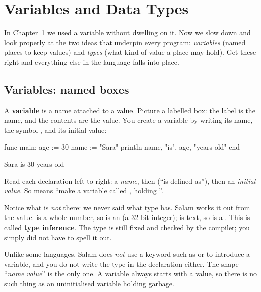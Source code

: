\chapter{Variables and Data Types}%
\label{ch:variables-types}

In Chapter~1 we used a variable without dwelling on it. Now we slow down and look
properly at the two ideas that underpin every program: \emph{variables} (named
places to keep values) and \emph{types} (what kind of value a place may hold).
Get these right and everything else in the language falls into place.

\section{Variables: named boxes}

A \textbf{variable} is a name attached to a value. Picture a labelled box: the
label is the name, and the contents are the value. You create a variable by
writing its name, the symbol \code{:=}, and its initial value:

\begin{salamen}
func main:
    age := 30
    name := "Sara"
    println name, "is", age, "years old"
end
\end{salamen}

\begin{progout}
Sara is 30 years old
\end{progout}

Read each declaration left to right: a \emph{name}, then \code{:=} (``is
defined as''), then an \emph{initial value}. So  means ``make a
variable called , holding ''.

Notice what is \emph{not} there: we never said what type  has. Salam
works it out from the value.  is a whole number, so  is an
 (a 32-bit integer);  is text, so  is a
. This is called \textbf{type inference}. The type is still fixed and
checked by the compiler; you simply did not have to spell it out.

\begin{note}
Unlike some languages, Salam does \emph{not} use a keyword such as  or
 to introduce a variable, and you do not write the type in the
declaration either. The shape ``\textit{name} \code{:=} \textit{value}'' is the
only one. A variable always starts with a value, so there is no such thing as
an uninitialised variable holding garbage.
\end{note}

